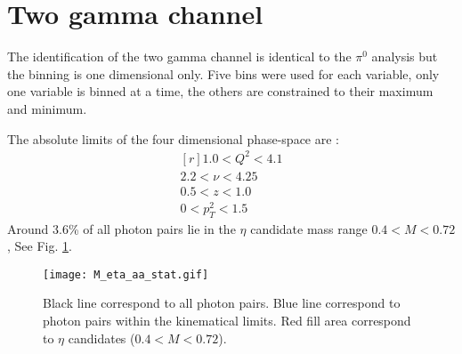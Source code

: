 \section{Two gamma channel}
The identification of the two gamma channel is identical to the $\pi^0$ analysis \cite{Taya_analysis_note} but the binning is one dimensional only. Five bins were used for each variable, only one variable is binned at a time, the others are constrained to their maximum and minimum. 

The absolute limits of the four dimensional phase-space are :
\begin{equation}
\begin{matrix*}[r]
1.0<Q^{2}<4.1\\
2.2<\nu<4.25\\
0.5<z<1.0\\
0<p_{T}^{2}<1.5
\end{matrix*}
\label{eq:abs_lim}
\end{equation}
Around 3.6\% of all photon pairs lie in the $\eta$ candidate mass range $0.4<M<0.72$, See Fig. \ref{fig:M_eta_aa_stat}.
%
\begin{figure}[!ht]
\centering
\texttt{[image: M\_eta\_aa\_stat.gif]}
\caption{Black line correspond to all photon pairs. Blue line correspond to photon pairs within the kinematical limits. Red fill area correspond to $\eta$ candidates ($0.4<M<0.72$).}
\label{fig:M_eta_aa_stat}
\end{figure}
%

